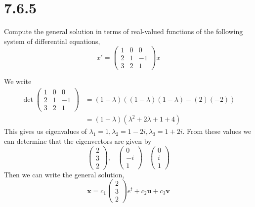 \documentclass{article}
\theoremstyle{definition}
\begin{document}
\section*{7.6.5}
    \begin{mdframed}[]
        Compute the general solution in terms of real-valued functions of the following system of differential equations,
        \[
            x' = \begin{pmatrix}
                1 & 0 & 0 \\
                2 & 1 & -1 \\
                3 & 2 & 1
            \end{pmatrix}x
        \]
    \end{mdframed}
    We write 
    \begin{align*}
        \det\begin{pmatrix}
            1 & 0 & 0 \\
                2 & 1 & -1 \\
                3 & 2 & 1
        \end{pmatrix} &= (1 - \lambda)\left((1 - \lambda)(1 - \lambda) - (2)(-2)\right) \\
        &= (1 - \lambda)(\lambda^2 + 2\lambda + 1 + 4)
    \end{align*}
    This gives us eigenvalues of $\lambda_1 = 1, \lambda_2 = 1 - 2i, \lambda_3 = 1 + 2i$. From 
    these values we can determine that the eigenvectors are given by
    \[
        \begin{pmatrix}
            2 \\
            3 \\
            2
        \end{pmatrix}, \ \ \ \ \begin{pmatrix}
            0 \\
            -i \\
            1
        \end{pmatrix} \ \ \ \ \begin{pmatrix}
            0 \\
            i \\
            1
        \end{pmatrix}
    \]
    Then we can write the general solution,
    \[
        \bm x = c_1 \begin{pmatrix}
            2\\
            3\\
            2
        \end{pmatrix}e^t + c_2 \bm u + c_3 \bm v
    \]
\end{document}

